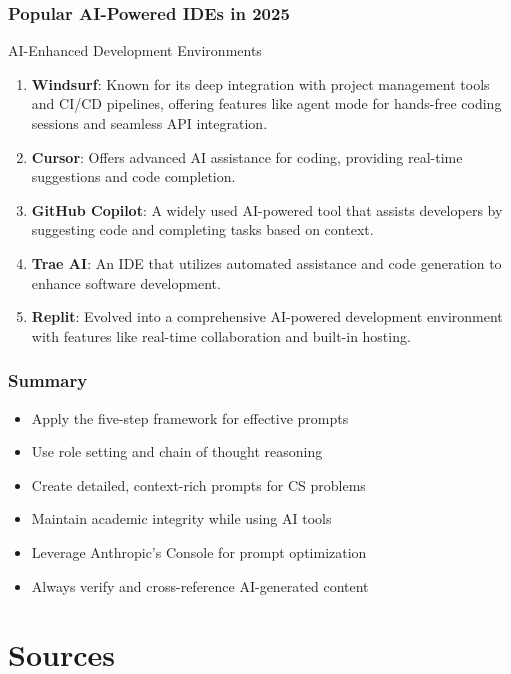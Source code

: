 \documentclass{beamer}
\begin{document}
\begin{frame}
\frametitle{Popular AI-Powered IDEs in 2025}

\begin{block}{AI-Enhanced Development Environments}
\begin{enumerate}
\item \textbf{Windsurf}: Known for its deep integration with project management tools and CI/CD pipelines, offering features like agent mode for hands-free coding sessions and seamless API integration.

\item \textbf{Cursor}: Offers advanced AI assistance for coding, providing real-time suggestions and code completion.

\item \textbf{GitHub Copilot}: A widely used AI-powered tool that assists developers by suggesting code and completing tasks based on context.

\item \textbf{Trae AI}: An IDE that utilizes automated assistance and code generation to enhance software development.

\item \textbf{Replit}: Evolved into a comprehensive AI-powered development environment with features like real-time collaboration and built-in hosting.
\end{enumerate}
\end{block}
\end{frame}


\begin{frame}
\frametitle{Summary}
\begin{itemize}
\item Apply the five-step framework for effective prompts
\item Use role setting and chain of thought reasoning
\item Create detailed, context-rich prompts for CS problems
\item Maintain academic integrity while using AI tools
\item Leverage Anthropic's Console for prompt optimization
\item Always verify and cross-reference AI-generated content
\end{itemize}
\end{frame}

\section{Sources}
\frame{\sectionpage}
\end{document}
